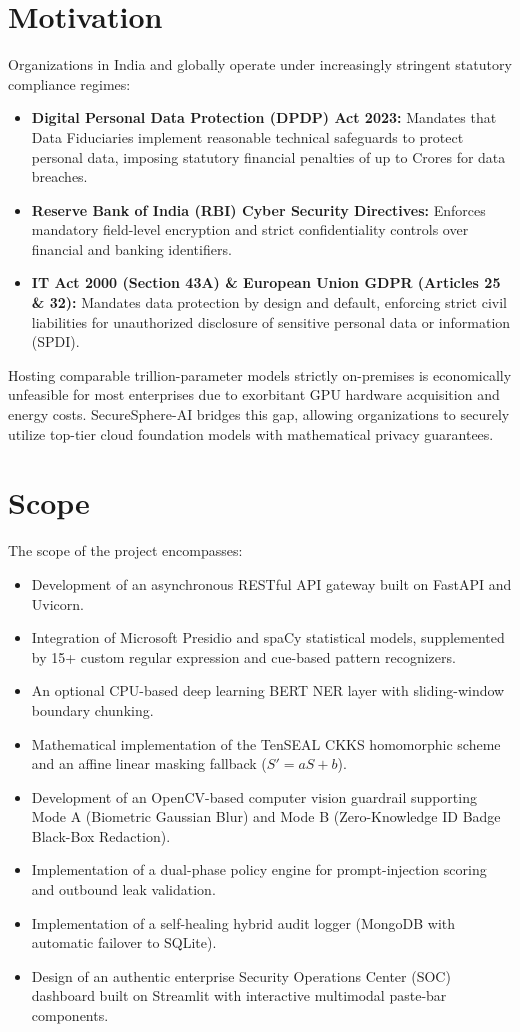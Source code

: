 \documentclass[12pt,a4paper,oneside]{report}
\numberwithin{equation}{chapter}
\begin{document}
\section{Motivation}
Organizations in India and globally operate under increasingly stringent statutory compliance regimes:
\begin{itemize}[leftmargin=*]
    \item \textbf{Digital Personal Data Protection (DPDP) Act 2023:} Mandates that Data Fiduciaries implement reasonable technical safeguards to protect personal data, imposing statutory financial penalties of up to  Crores for data breaches.
    \item \textbf{Reserve Bank of India (RBI) Cyber Security Directives:} Enforces mandatory field-level encryption and strict confidentiality controls over financial and banking identifiers.
    \item \textbf{IT Act 2000 (Section 43A) \& European Union GDPR (Articles 25 \& 32):} Mandates data protection by design and default, enforcing strict civil liabilities for unauthorized disclosure of sensitive personal data or information (SPDI).
\end{itemize}
Hosting comparable trillion-parameter models strictly on-premises is economically unfeasible for most enterprises due to exorbitant GPU hardware acquisition and energy costs. SecureSphere-AI bridges this gap, allowing organizations to securely utilize top-tier cloud foundation models with mathematical privacy guarantees.

\section{Scope}
The scope of the project encompasses:
\begin{itemize}[leftmargin=*]
    \item Development of an asynchronous RESTful API gateway built on FastAPI and Uvicorn.
    \item Integration of Microsoft Presidio and spaCy statistical models, supplemented by 15+ custom regular expression and cue-based pattern recognizers.
    \item An optional CPU-based deep learning BERT NER layer with sliding-window boundary chunking.
    \item Mathematical implementation of the TenSEAL CKKS homomorphic scheme and an affine linear masking fallback ($S' = aS + b$).
    \item Development of an OpenCV-based computer vision guardrail supporting Mode A (Biometric Gaussian Blur) and Mode B (Zero-Knowledge ID Badge Black-Box Redaction).
    \item Implementation of a dual-phase policy engine for prompt-injection scoring and outbound leak validation.
    \item Implementation of a self-healing hybrid audit logger (MongoDB with automatic failover to SQLite).
    \item Design of an authentic enterprise Security Operations Center (SOC) dashboard built on Streamlit with interactive multimodal paste-bar components.
\end{itemize}
\end{document}
